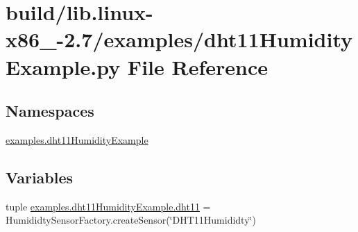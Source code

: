 \hypertarget{build_2lib_8linux-x86__64-2_87_2examples_2dht11HumidityExample_8py}{}\section{build/lib.linux-\/x86\+\_-\/2.7/examples/dht11\+Humidity\+Example.py File Reference}
\label{build_2lib_8linux-x86__64-2_87_2examples_2dht11HumidityExample_8py}
\subsection*{Namespaces}
\begin{DoxyCompactItemize}
\item 
 \hyperlink{namespaceexamples_1_1dht11HumidityExample}{examples.\+dht11\+Humidity\+Example}
\end{DoxyCompactItemize}
\subsection*{Variables}
\begin{DoxyCompactItemize}
\item 
tuple \hyperlink{namespaceexamples_1_1dht11HumidityExample_af2190e789e236b21aeae169631c50d0d}{examples.\+dht11\+Humidity\+Example.\+dht11} = Humididty\+Sensor\+Factory.\+create\+Sensor(\char`\"{}D\+H\+T11\+Humididty\char`\"{})
\end{DoxyCompactItemize}
